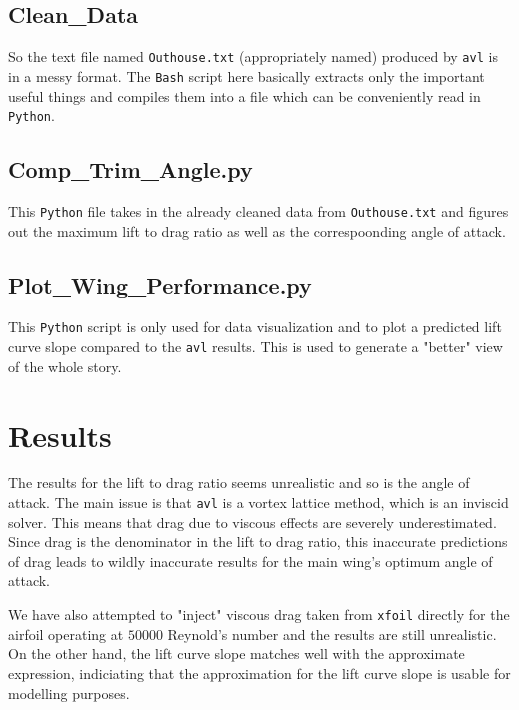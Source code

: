 \subsection{Clean\_Data}
\begin{comment}
\end{comment}
So the text file named \texttt{Outhouse.txt} (appropriately named) produced by \texttt{avl} is in a messy format. The \texttt{Bash} script here basically extracts only the important useful things and compiles them into a file which can be conveniently read in \texttt{Python}.


\subsection{Comp\_Trim\_Angle.py}
\begin{comment}
\end{comment}
This \texttt{Python} file takes in the already cleaned data from \texttt{Outhouse.txt} and figures out the maximum lift to drag ratio as well as the correspoonding angle of attack.


\subsection{Plot\_Wing\_Performance.py}
\begin{comment}
\end{comment}
This \texttt{Python} script is only used for data visualization and to plot a predicted lift curve slope compared to the \texttt{avl} results. This is used to generate a "better" view of the whole story.



\section{Results}
\begin{comment}
\end{comment}

The results for the lift to drag ratio seems unrealistic and so is the angle of attack. The main issue is that \texttt{avl} is a vortex lattice method, which is an inviscid solver. This means that drag due to viscous effects are severely underestimated. Since drag is the denominator in the lift to drag ratio, this inaccurate predictions of drag leads to wildly inaccurate results for the main wing's optimum angle of attack.

We have also attempted to "inject" viscous drag taken from \texttt{xfoil} directly for the airfoil operating at $50000$ Reynold's number and the results are still unrealistic. On the other hand, the lift curve slope matches well with the approximate expression, indiciating that the approximation for the lift curve slope is usable for modelling purposes.


